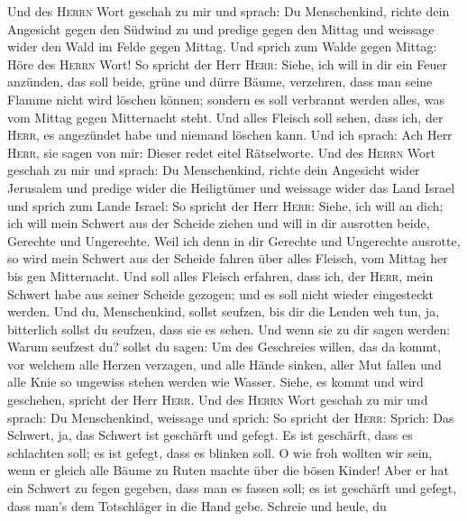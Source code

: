  Und des \textsc{Herrn} Wort geschah zu mir und sprach:
 Du Menschenkind, richte dein Angesicht gegen den Südwind
zu und predige gegen den Mittag und weissage wider den Wald im Felde
gegen Mittag.  Und sprich zum Walde gegen Mittag: Höre des
\textsc{Herrn} Wort! So spricht der Herr \textsc{Herr}: Siehe, ich will
in dir ein Feuer anzünden, das soll beide, grüne und dürre Bäume,
verzehren, dass man seine Flamme nicht wird löschen können; sondern es
soll verbrannt werden alles, was vom Mittag gegen Mitternacht steht.
 Und alles Fleisch soll sehen, dass ich, der
\textsc{Herr}, es angezündet habe und niemand löschen kann.
 Und ich sprach: Ach Herr \textsc{Herr}, sie sagen von
mir: Dieser redet eitel Rätselworte.  Und des
\textsc{Herrn} Wort geschah zu mir und sprach:  Du
Menschenkind, richte dein Angesicht wider Jerusalem und predige wider
die Heiligtümer und weissage wider das Land Israel  und
sprich zum Lande Israel: So spricht der Herr \textsc{Herr}: Siehe, ich
will an dich; ich will mein Schwert aus der Scheide ziehen und will in
dir ausrotten beide, Gerechte und Ungerechte.  Weil ich
denn in dir Gerechte und Ungerechte ausrotte, so wird mein Schwert aus
der Scheide fahren über alles Fleisch, vom Mittag her bis gen
Mitternacht.  Und soll alles Fleisch erfahren, dass ich,
der \textsc{Herr}, mein Schwert habe aus seiner Scheide gezogen; und es
soll nicht wieder eingesteckt werden.  Und du,
Menschenkind, sollst seufzen, bis dir die Lenden weh tun, ja, bitterlich
sollst du seufzen, dass sie es sehen.  Und wenn sie zu
dir sagen werden: Warum seufzest du? sollst du sagen: Um des Geschreies
willen, das da kommt, vor welchem alle Herzen verzagen, und alle Hände
sinken, aller Mut fallen und alle Knie so ungewiss stehen werden wie
Wasser. Siehe, es kommt und wird geschehen, spricht der Herr
\textsc{Herr}.  Und des \textsc{Herrn} Wort geschah zu
mir und sprach:  Du Menschenkind, weissage und sprich: So
spricht der \textsc{Herr}: Sprich: Das Schwert, ja, das Schwert ist
geschärft und gefegt.  Es ist geschärft, dass es
schlachten soll; es ist gefegt, dass es blinken soll. O wie froh wollten
wir sein, wenn er gleich alle Bäume zu Ruten machte über die bösen
Kinder!  Aber er hat ein Schwert zu fegen gegeben, dass
man es fassen soll; es ist geschärft und gefegt, dass man's dem
Totschläger in die Hand gebe.  Schreie und heule, du
